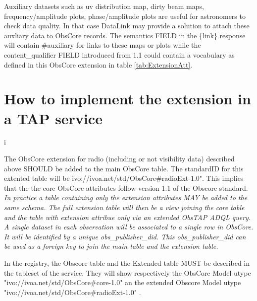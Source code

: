 \documentclass[11pt,a4paper]{ivoa}
\begin{document}
Auxiliary datasets such as  uv distribution map, dirty beam maps, frequency/amplitude plots, phase/amplitude plots are useful for astronomers to check data quality.  
In that case DataLink \citep{2015ivoa.spec.0617D} may provide a solution to attach these auxliary data to ObsCore records. The semantics FIELD in the \{link\} response  will contain \#auxiliary  for links to these maps or plots while  the content\_qualifier FIELD introduced from 1.1  could contain a vocabulary as defined in this ObsCore extension in table \ref{tab:ExtensionAtt}.


\section{How to implement the extension in a TAP service}i
\label{sec:implementation}

The ObsCore extension for radio (including or not visibility data) described above SHOULD  be added to the main ObsCore table. The standardID for this extented table will be ivo://ivoa.net/std/ObsCore\#radioExt-1.0". This implies that the the core ObsCore attributes follow version 1.1 of the Obscore standard.
\textit{ In practice a  table containing only the extension attributes  MAY be added to the same schema. The full extension table will then be a view joining the core table and the  table with extension attribue only via an extended ObsTAP ADQL query. A single dataset in each observation will be associated to a single row in ObsCore. It will be identified by a unique obs\_publisher\_did. This obs\_publisher\_did can be used as a foreign key to join the main table and the extension table.}

In the registry, the Obscore table and the Extended table MUST be described in the tableset of the service. They will show respectively the ObsCore Model utype "ivo://ivoa.net/std/ObsCore\#core-1.0" an the extended Obscore Model utype "ivo://ivoa.net/std/ObsCore\#radioExt-1.0" . 
\end{document}
